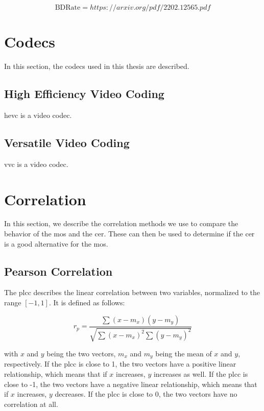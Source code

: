 \begin{equation}
    \text{BDRate} = https://arxiv.org/pdf/2202.12565.pdf
    \label{eq:bdrate}
\end{equation}

\section{Codecs}
\label{sec:codecs}

In this section, the codecs used in this thesis are described.

\subsection{High Efficiency Video Coding}
\label{subsec:hevc}

\gls{hevc} is a video codec.

\subsection{Versatile Video Coding}
\label{subsec:vvc}

\gls{vvc} is a video codec.


\section{Correlation}
\label{sec:correlation}

In this section, we describe the correlation methods we use to compare the behavior of the \gls{mos} and the \gls{cer}.
These can then be used to determine if the \gls{cer} is a good alternative for the \gls{mos}.

\subsection{Pearson Correlation}
\label{subsec:pearson}

The \gls{plcc} \cite{pears_spear_2016} describes the linear correlation between two variables, normalized to the range \([-1, 1]\).
It is defined as follows:

\begin{equation}
    r_p = \frac{\sum{(x-m_x)(y-m_y)}}{\sqrt{\sum{(x-m_x)^2}\sum{(y-m_y)^2}}}
    \label{eq:pearson}
\end{equation}

with \(x\) and \(y\) being the two vectors, \(m_x\) and \(m_y\) being the mean of \(x\) and \(y\), respectively.
If the \gls{plcc} is close to 1, the two vectors have a positive linear relationship, which means that if \(x\) increases, \(y\) increases as well.
If the \gls{plcc} is close to -1, the two vectors have a negative linear relationship, which means that if \(x\) increases, \(y\) decreases.
If the \gls{plcc} is close to 0, the two vectors have no correlation at all.

